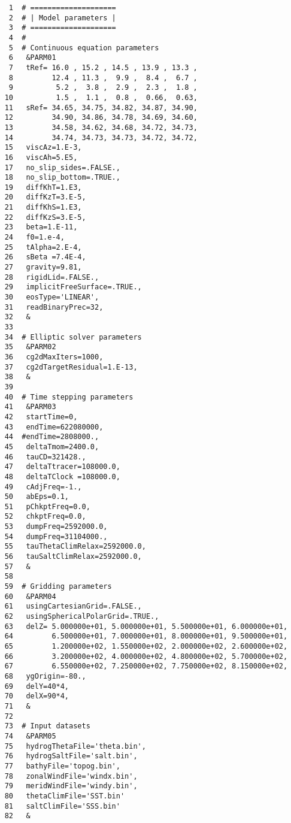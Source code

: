 
\begin{verbatim}
     1	# ====================
     2	# | Model parameters |
     3	# ====================
     4	#
     5	# Continuous equation parameters
     6	 &PARM01
     7	 tRef= 16.0 , 15.2 , 14.5 , 13.9 , 13.3 ,
     8	       12.4 , 11.3 ,  9.9 ,  8.4 ,  6.7 ,
     9	        5.2 ,  3.8 ,  2.9 ,  2.3 ,  1.8 ,
    10	        1.5 ,  1.1 ,  0.8 ,  0.66,  0.63,
    11	 sRef= 34.65, 34.75, 34.82, 34.87, 34.90,
    12	       34.90, 34.86, 34.78, 34.69, 34.60,
    13	       34.58, 34.62, 34.68, 34.72, 34.73,
    14	       34.74, 34.73, 34.73, 34.72, 34.72,
    15	 viscAz=1.E-3,
    16	 viscAh=5.E5,
    17	 no_slip_sides=.FALSE.,
    18	 no_slip_bottom=.TRUE.,
    19	 diffKhT=1.E3,
    20	 diffKzT=3.E-5,
    21	 diffKhS=1.E3,
    22	 diffKzS=3.E-5,
    23	 beta=1.E-11,
    24	 f0=1.e-4,
    25	 tAlpha=2.E-4,
    26	 sBeta =7.4E-4,
    27	 gravity=9.81,
    28	 rigidLid=.FALSE.,
    29	 implicitFreeSurface=.TRUE.,
    30	 eosType='LINEAR',
    31	 readBinaryPrec=32,
    32	 &
    33	
    34	# Elliptic solver parameters
    35	 &PARM02
    36	 cg2dMaxIters=1000,
    37	 cg2dTargetResidual=1.E-13,
    38	 &
    39	
    40	# Time stepping parameters
    41	 &PARM03
    42	 startTime=0,
    43	 endTime=622080000,
    44	#endTime=2808000.,
    45	 deltaTmom=2400.0,
    46	 tauCD=321428.,
    47	 deltaTtracer=108000.0,
    48	 deltaTClock =108000.0,
    49	 cAdjFreq=-1.,
    50	 abEps=0.1,
    51	 pChkptFreq=0.0,
    52	 chkptFreq=0.0,
    53	 dumpFreq=2592000.0,
    54	 dumpFreq=31104000.,
    55	 tauThetaClimRelax=2592000.0,
    56	 tauSaltClimRelax=2592000.0,
    57	 &
    58	
    59	# Gridding parameters
    60	 &PARM04
    61	 usingCartesianGrid=.FALSE.,
    62	 usingSphericalPolarGrid=.TRUE.,
    63	 delZ= 5.000000e+01, 5.000000e+01, 5.500000e+01, 6.000000e+01,
    64	       6.500000e+01, 7.000000e+01, 8.000000e+01, 9.500000e+01,
    65	       1.200000e+02, 1.550000e+02, 2.000000e+02, 2.600000e+02,
    66	       3.200000e+02, 4.000000e+02, 4.800000e+02, 5.700000e+02,
    67	       6.550000e+02, 7.250000e+02, 7.750000e+02, 8.150000e+02,
    68	 ygOrigin=-80.,
    69	 delY=40*4,
    70	 delX=90*4,
    71	 &
    72	
    73	# Input datasets
    74	 &PARM05
    75	 hydrogThetaFile='theta.bin',
    76	 hydrogSaltFile='salt.bin',
    77	 bathyFile='topog.bin',
    78	 zonalWindFile='windx.bin',
    79	 meridWindFile='windy.bin',
    80	 thetaClimFile='SST.bin'
    81	 saltClimFile='SSS.bin'
    82	 &
\end{verbatim}
